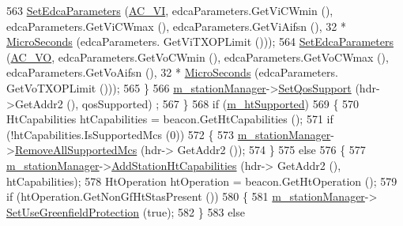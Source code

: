 \begin{DoxyCode}
563                   \hyperlink{classns3_1_1StaWifiMac_a9963539876f26c21aa9866bcf998cda7}{SetEdcaParameters} (\hyperlink{group__wifi_ggab422b4562ba272b39a9b6bca3513f3aca1c60bd99c5ede59bb50b91182cb81d0f}{AC\_VI}, edcaParameters.GetViCWmin (), 
      edcaParameters.GetViCWmax (), edcaParameters.GetViAifsn (), 32 * \hyperlink{group__timecivil_ga17465a639c8d1464e76538afdd78a9f0}{MicroSeconds} (edcaParameters.
      GetViTXOPLimit ()));
564                   \hyperlink{classns3_1_1StaWifiMac_a9963539876f26c21aa9866bcf998cda7}{SetEdcaParameters} (\hyperlink{group__wifi_ggab422b4562ba272b39a9b6bca3513f3aca147b7f007ca5459e52ee93d1ebe83639}{AC\_VO}, edcaParameters.GetVoCWmin (), 
      edcaParameters.GetVoCWmax (), edcaParameters.GetVoAifsn (), 32 * \hyperlink{group__timecivil_ga17465a639c8d1464e76538afdd78a9f0}{MicroSeconds} (edcaParameters.
      GetVoTXOPLimit ()));
565                 \}
566               \hyperlink{classns3_1_1RegularWifiMac_a76d1a5e27b64bfe36f24a55d1eea2775}{m\_stationManager}->\hyperlink{classns3_1_1WifiRemoteStationManager_a8146d57b94ed85447d28a3f66e24d45b}{SetQosSupport} (hdr->GetAddr2 (), qosSupported)
      ;
567             \}
568           \textcolor{keywordflow}{if} (\hyperlink{classns3_1_1RegularWifiMac_a8950c44b8cf2ad1f9274821cf88adc7b}{m\_htSupported})
569             \{
570               HtCapabilities htCapabilities = beacon.GetHtCapabilities ();
571               \textcolor{keywordflow}{if} (!htCapabilities.IsSupportedMcs (0))
572                 \{
573                   \hyperlink{classns3_1_1RegularWifiMac_a76d1a5e27b64bfe36f24a55d1eea2775}{m\_stationManager}->\hyperlink{classns3_1_1WifiRemoteStationManager_a56e6fa217c536de55870bbb7166501c7}{RemoveAllSupportedMcs} (hdr->
      GetAddr2 ());
574                 \}
575               \textcolor{keywordflow}{else}
576                 \{
577                   \hyperlink{classns3_1_1RegularWifiMac_a76d1a5e27b64bfe36f24a55d1eea2775}{m\_stationManager}->\hyperlink{classns3_1_1WifiRemoteStationManager_ae78d843a98a66ff2d8584da8ed189b4d}{AddStationHtCapabilities} (hdr->
      GetAddr2 (), htCapabilities);
578                   HtOperation htOperation = beacon.GetHtOperation ();
579                   \textcolor{keywordflow}{if} (htOperation.GetNonGfHtStasPresent ())
580                     \{
581                       \hyperlink{classns3_1_1RegularWifiMac_a76d1a5e27b64bfe36f24a55d1eea2775}{m\_stationManager}->
      \hyperlink{classns3_1_1WifiRemoteStationManager_af420085117ec1e0f26fc494cc978ab7d}{SetUseGreenfieldProtection} (\textcolor{keyword}{true});
582                     \}
583                   \textcolor{keywordflow}{else}

\end{DoxyCode}

